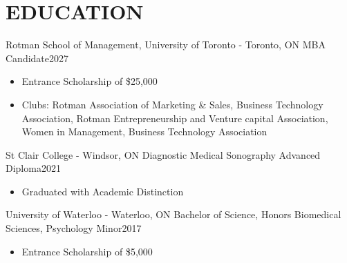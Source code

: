 
\section{\textcolor{airforceblue}{EDUCATION}}
  \employmentSubheadingListStart
    \employmentSubheading
      {Rotman School of Management, University of Toronto - Toronto, ON}{}
      {MBA Candidate}{2027}
      \begin{itemize}[leftmargin=1.5em]
        \item Entrance Scholarship of \$25,000
        \item Clubs: Rotman Association of Marketing \& Sales, Business Technology Association, Rotman Entrepreneurship and Venture capital Association, Women in Management, Business Technology Association
      \end{itemize}
    \employmentSubheading
      {St Clair College - Windsor, ON}{}
      {Diagnostic Medical Sonography Advanced Diploma}{2021}
      \begin{itemize}[leftmargin=1.5em]
        \item Graduated with Academic Distinction
      \end{itemize}
    \employmentSubheading
      {University of Waterloo - Waterloo, ON}{}
      {Bachelor of Science, Honors Biomedical Sciences, Psychology Minor}{2017}
      \begin{itemize}[leftmargin=1.5em]
        \item Entrance Scholarship of \$5,000
      \end{itemize}
  \employmentSubheadingListEnd
  \vspace{-16pt}

